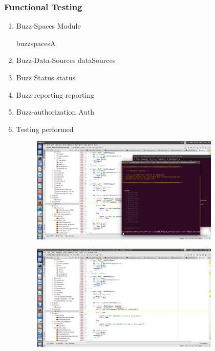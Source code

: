\documentclass[hidelinks, 12pt, oneside]{article}
\begin{document}
\subsubsection{Functional Testing}
\begin {enumerate}
\item Buzz-Spaces Module

 {buzzspacesA}

\item Buzz-Data-Sources
 {dataSources}

\item Buzz Status
 {status}

\item Buzz-reporting
 {reporting}

\item Buzz-authorization
 {Auth}

\item Testing performed 

\begin{figure}[h!]
  \centering
    \includegraphics[width=0.85\textwidth]{Testing} 
\end{figure}

\begin{figure}[h!]
  \centering
    \includegraphics[width=0.85\textwidth]{TestAuto} 
\end{figure}


\end {enumerate}
 
\end{document}
